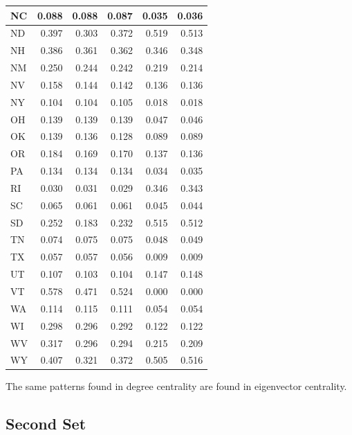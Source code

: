 \documentclass[]{article}
\begin{document}
\begin{table}[!h]
\begin{tabular}{l|r|r|r|r|r}
\hline
\rowcolor{gray!6}  NC & 0.088 & 0.088 & 0.087 & 0.035 & 0.036\\
\hline
ND & 0.397 & 0.303 & 0.372 & 0.519 & 0.513\\
\hline
\rowcolor{gray!6}  NH & 0.386 & 0.361 & 0.362 & 0.346 & 0.348\\
\hline
NM & 0.250 & 0.244 & 0.242 & 0.219 & 0.214\\
\hline
\rowcolor{gray!6}  NV & 0.158 & 0.144 & 0.142 & 0.136 & 0.136\\
\hline
NY & 0.104 & 0.104 & 0.105 & 0.018 & 0.018\\
\hline
\rowcolor{gray!6}  OH & 0.139 & 0.139 & 0.139 & 0.047 & 0.046\\
\hline
OK & 0.139 & 0.136 & 0.128 & 0.089 & 0.089\\
\hline
\rowcolor{gray!6}  OR & 0.184 & 0.169 & 0.170 & 0.137 & 0.136\\
\hline
PA & 0.134 & 0.134 & 0.134 & 0.034 & 0.035\\
\hline
\rowcolor{gray!6}  RI & 0.030 & 0.031 & 0.029 & 0.346 & 0.343\\
\hline
SC & 0.065 & 0.061 & 0.061 & 0.045 & 0.044\\
\hline
\rowcolor{gray!6}  SD & 0.252 & 0.183 & 0.232 & 0.515 & 0.512\\
\hline
TN & 0.074 & 0.075 & 0.075 & 0.048 & 0.049\\
\hline
\rowcolor{gray!6}  TX & 0.057 & 0.057 & 0.056 & 0.009 & 0.009\\
\hline
UT & 0.107 & 0.103 & 0.104 & 0.147 & 0.148\\
\hline
\rowcolor{gray!6}  VT & 0.578 & 0.471 & 0.524 & 0.000 & 0.000\\
\hline
WA & 0.114 & 0.115 & 0.111 & 0.054 & 0.054\\
\hline
\rowcolor{gray!6}  WI & 0.298 & 0.296 & 0.292 & 0.122 & 0.122\\
\hline
WV & 0.317 & 0.296 & 0.294 & 0.215 & 0.209\\
\hline
\rowcolor{gray!6}  WY & 0.407 & 0.321 & 0.372 & 0.505 & 0.516\\
\hline
\end{tabular}
\end{table}

The same patterns found in degree centrality are found in eigenvector
centrality.

\subsection{Second Set}\label{second-set-1}
\end{document}
